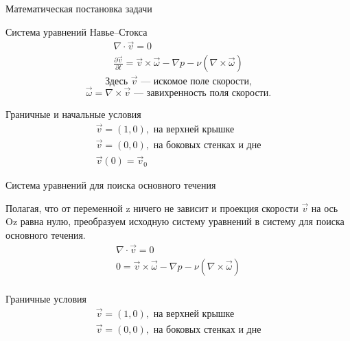 \documentclass{beamer}
\begin{document}
\begin{frame}{Математическая постановка задачи}
	\begin{block}{Система уравнений Навье--Стокса}
		\begin{gather*}
			\nabla \cdot \vec v = 0 \\
			\frac{\partial \vec v}{\partial t} = \vec v \times \vec \omega - \nabla p - 
			\nu ( \nabla \times \vec \omega ) 
		\end{gather*}
		$$
			\text{Здесь } \vec v \text{ --- искомое поле скорости,} 
		$$ $$
			\vec \omega = \nabla \times \vec v \text{ --- завихренность поля скорости.}
		$$
	\end{block}

	\begin{block}{Граничные и начальные условия}
		\begin{gather*}
			\vec v = (1,0), \text{ на верхней крышке} \\
			\vec v = (0,0), \text{ на боковых стенках и дне}\\
			\vec v (0) = \vec v _0
		\end{gather*}
	\end{block}

\end{frame}

\begin{frame}{Система уравнений для поиска основного течения}
	\begin{block}{}
		Полагая, что от переменной z ничего не зависит и проекция скорости $\vec v$ на ось Oz равна нулю, преобразуем исходную систему 
		уравнений в систему для поиска основного течения. 
		\begin{gather*}
			\nabla \cdot \vec v = 0 \\
			0 = \vec v \times \vec \omega - \nabla p - \nu ( \nabla \times \vec \omega ) \\
		\end{gather*}
	\end{block}

	\begin{block}{Граничные условия}
		\begin{gather*}
			\vec v = (1,0), \text{ на верхней крышке} \\
			\vec v = (0,0), \text{ на боковых стенках и дне}
		\end{gather*}
	\end{block}
\end{frame}
\end{document}

